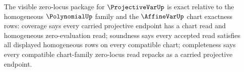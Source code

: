 
\begin{theorem}
\label{thm:projectivevar-homogeneous-zero-locus-exactness-obligation}
The visible zero-locus package for $\ProjectiveVarUp$ is exact relative to the homogeneous $\PolynomialUp$ family and the $\AffineVarUp$ chart exactness rows: coverage says every carried projective endpoint has a chart read and homogeneous zero-evaluation read; soundness says every accepted read satisfies all displayed homogeneous rows on every compatible chart; completeness says every compatible chart-family zero-locus read repacks as a carried projective endpoint.
\end{theorem}
